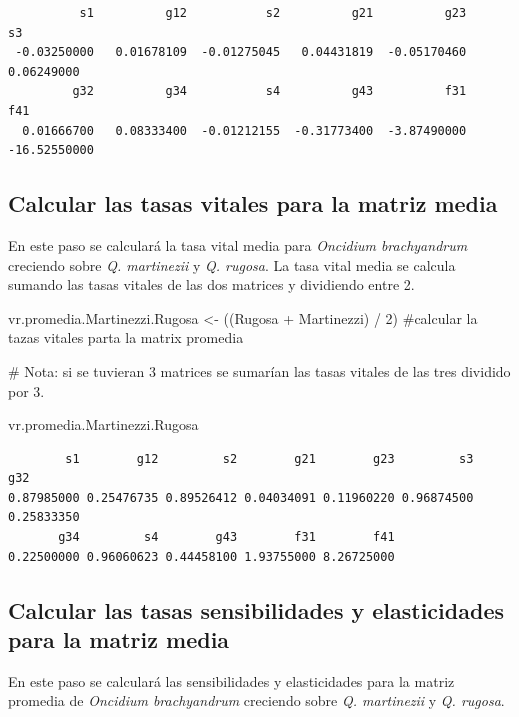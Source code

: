 \documentclass[
  12pt,
  letterpaper,
]{book}
\newenvironment{Shaded}{\begin{snugshade}}{\end{snugshade}}
\newcommand{\CommentTok}[1]{\textcolor[rgb]{0.37,0.37,0.37}{#1}}
\newcommand{\DecValTok}[1]{\textcolor[rgb]{0.68,0.00,0.00}{#1}}
\newcommand{\NormalTok}[1]{\textcolor[rgb]{0.00,0.23,0.31}{#1}}
\newcommand{\OtherTok}[1]{\textcolor[rgb]{0.00,0.23,0.31}{#1}}
\newcommand{\SpecialCharTok}[1]{\textcolor[rgb]{0.37,0.37,0.37}{#1}}
\begin{document}
\begin{verbatim}
          s1          g12           s2          g21          g23           s3 
 -0.03250000   0.01678109  -0.01275045   0.04431819  -0.05170460   0.06249000 
         g32          g34           s4          g43          f31          f41 
  0.01666700   0.08333400  -0.01212155  -0.31773400  -3.87490000 -16.52550000 
\end{verbatim}

\subsection{Calcular las tasas vitales para la matriz
media}\label{calcular-las-tasas-vitales-para-la-matriz-media}

En este paso se calculará la tasa vital media para \emph{Oncidium
brachyandrum} creciendo sobre \emph{Q. martinezii} y \emph{Q. rugosa}.
La tasa vital media se calcula sumando las tasas vitales de las dos
matrices y dividiendo entre 2.

\begin{Shaded}
\begin{Highlighting}[]
\NormalTok{vr.promedia.Martinezzi.Rugosa }\OtherTok{\textless{}{-}}\NormalTok{ ((Rugosa }\SpecialCharTok{+}\NormalTok{ Martinezzi) }\SpecialCharTok{/} \DecValTok{2}\NormalTok{) }\CommentTok{\#calcular la tazas vitales parta la matrix promedia}

\CommentTok{\# Nota: si se tuvieran 3 matrices se sumarían las tasas vitales de las tres dividido por 3.}

\NormalTok{vr.promedia.Martinezzi.Rugosa}
\end{Highlighting}
\end{Shaded}

\begin{verbatim}
        s1        g12         s2        g21        g23         s3        g32 
0.87985000 0.25476735 0.89526412 0.04034091 0.11960220 0.96874500 0.25833350 
       g34         s4        g43        f31        f41 
0.22500000 0.96060623 0.44458100 1.93755000 8.26725000 
\end{verbatim}

\subsection{Calcular las tasas sensibilidades y elasticidades para la
matriz
media}\label{calcular-las-tasas-sensibilidades-y-elasticidades-para-la-matriz-media}

En este paso se calculará las sensibilidades y elasticidades para la
matriz promedia de \emph{Oncidium brachyandrum} creciendo sobre \emph{Q.
martinezii} y \emph{Q. rugosa}.
\end{document}
